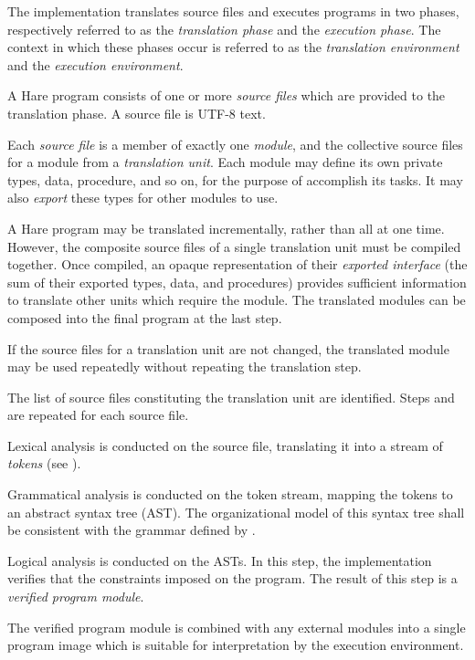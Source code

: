 
\specitem
The implementation translates source files and executes programs in two phases,
respectively referred to as the \textit{translation phase} and the
\textit{execution phase}. The context in which these phases occur is referred
to as the \textit{translation environment} and the \textit{execution
environment}.


\specsubitem
A Hare program consists of one or more \textit{source files} which are provided
to the translation phase. A source file is UTF-8 text.

\specsubitem
Each \textit{source file} is a member of exactly one \textit{module}, and the
collective source files for a module from a \textit{translation unit}. Each
module may define its own private types, data, procedure, and so on, for the
purpose of accomplish its tasks. It may also \textit{export} these types for
other modules to use.

\specsubitem
A Hare program may be translated incrementally, rather than all at one time.
However, the composite source files of a single translation unit must be
compiled together. Once compiled, an opaque representation of their
\textit{exported interface} (the sum of their exported types, data, and
procedures) provides sufficient information to translate other units which
require the module. The translated modules can be composed into the final
program at the last step.

\specsubitem
If the source files for a translation unit are not changed, the translated
module may be used repeatedly without repeating the translation step.


\specsubitem
The list of source files constituting the translation unit are identified. Steps
 and  are
repeated for each source file.

\specsubitem
Lexical analysis is conducted on the source file, translating it into a stream
of \textit{tokens} (see ).

\specsubitem
Grammatical analysis is conducted on the token stream, mapping the tokens to an
abstract syntax tree (AST). The organizational model of this syntax tree shall
be consistent with the grammar defined by .

\specsubitem
Logical analysis is conducted on the ASTs. In this step, the implementation
verifies that the constraints imposed on the program. The result of this step is
a \textit{verified program module}.


\specsubitem
The verified program module is combined with any external modules into a single
program image which is suitable for interpretation by the execution environment.
